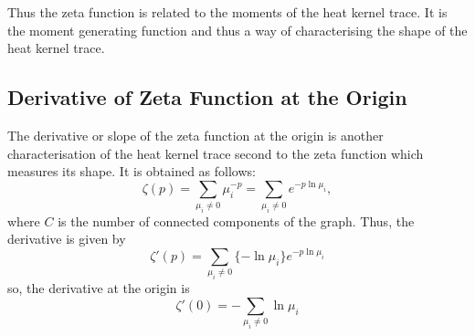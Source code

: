 \documentclass[10pt,a4paper]{article}
\theoremstyle{plain}
\theoremstyle{definition}
\begin{document}
    Thus the zeta function is related to the moments of the heat kernel trace. It is the moment generating function and thus a way of characterising the shape of the heat kernel trace.
    
      \subsection{Derivative of Zeta Function at the Origin}
    
    The derivative or slope of the zeta function at the origin is another characterisation of the heat kernel trace second to the zeta function which measures its shape. It is obtained as follows:
  	\begin{equation}
  	\zeta(p) = \sum_{\mu_i \neq 0} \mu_{i} ^{-p} = \sum_{\mu_i \neq 0} e^{-p \ln \mu_i},
  	\end{equation}
  	where $C$ is the number of connected components of the graph.
  	Thus, the derivative is given by
  	\begin{equation}
  	\zeta'(p) = \sum_{\mu_i \neq 0} \{-\ln \mu_i\}
  	e^{-p \ln \mu_i}
  	\end{equation}
  	so, the derivative at the origin is 
    \begin{equation}
    \zeta'(0) = -\sum_{\mu_i \neq 0}\ln \mu_i
    \label{final-zeta}
    \end{equation}
    
\end{document}
